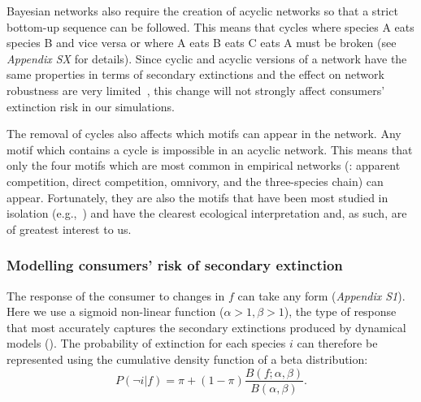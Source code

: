 \documentclass[12pt]{article}
\begin{document}
\begin{spacing}{2.0}
        
        Bayesian networks also require the creation of acyclic networks so that a strict bottom-up sequence can be followed. 
        This means that cycles where species A eats species B and vice versa or where A eats B eats C eats A must be broken (see \emph{Appendix SX} for details).
        Since cyclic and acyclic versions of a network have the same properties in terms of secondary extinctions and the effect on network robustness are very limited~\citep{Allesina2009functional}, this change will not strongly affect consumers' extinction risk in our simulations.

        
        The removal of cycles also affects which motifs can appear in the network. 
        Any motif which contains a cycle is impossible in an acyclic network.
        This means that only the four motifs which are most common in empirical networks (\citealp[]{Stouffer2007}: apparent competition, direct competition, omnivory, and the three-species chain) can appear.
        Fortunately, they are also the motifs that have been most studied in isolation (e.g.,~\citep{Hastings1991,Holt1987,Bascompte2005,Polis1989,Zabalo2012,Lefevre2009,Holt1997,Kondoh2008,McKinnon2013,Laws2013}) and have the clearest ecological interpretation and, as such, are of greatest interest to us.


        \subsubsection*{Modelling consumers' risk of secondary extinction}
        
        The response of the consumer to changes in $f$ can take any form (\emph{Appendix S1}). Here we use a sigmoid non-linear function ($\alpha > 1, \beta > 1$), the type of response that most accurately captures the secondary extinctions produced by dynamical models (\citealp[]{Eklof2013}).
		The probability of extinction for each species $i$ can therefore be represented using the cumulative density function of a beta distribution:
		\begin{equation}
		P(\lnot i|f) = \pi + (1 - \pi) \frac{B(f;\alpha,\beta)}{B(\alpha,\beta)}.
				\label{betafunc}
        \end{equation}
		

\end{spacing}
\end{document}
